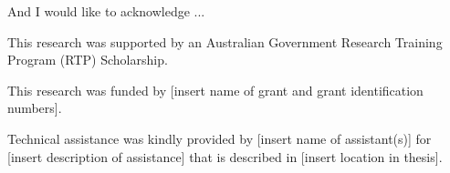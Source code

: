 
\begin{acknowledgements}      


And I would like to acknowledge ...

This research was supported by an Australian Government Research Training Program (RTP) Scholarship.

This research was funded by [insert name of grant and grant identification numbers].

Technical assistance was kindly provided by [insert name of assistant(s)] for [insert description of assistance] that is described in [insert location in thesis].



\end{acknowledgements}

